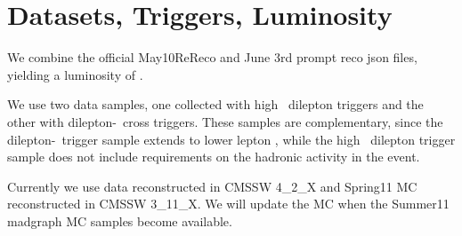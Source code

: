 \section{Datasets, Triggers, Luminosity}
\label{sec:datasets}

We combine the official May10ReReco and June 3rd prompt reco json files, yielding a luminosity of \lumi.

We use two data samples, one collected with high \pt\ dilepton triggers and the other 
with dilepton-\Ht\ cross triggers. These samples are complementary, since the dilepton-\Ht\
trigger sample extends to lower lepton \pt, while the high \pt\ dilepton trigger sample 
does not include requirements on the hadronic activity in the event. 

Currently we use data reconstructed in CMSSW 4\_2\_X and Spring11 MC reconstructed in CMSSW 3\_11\_X.
We will update the MC  when the Summer11 madgraph MC samples become available.

